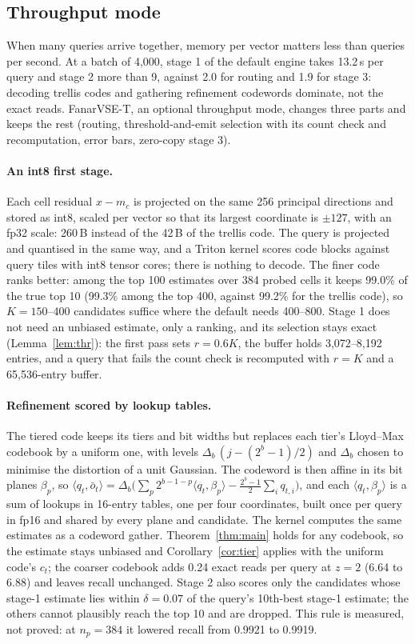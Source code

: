 \documentclass[fleqn,10pt]{wlscirep}
\begin{document}
\subsection{Throughput mode}\label{sec:tmode}
When many queries arrive together, memory per vector matters less than queries per second. At a batch of 4{,}000, stage 1 of the default engine takes 13.2\,\textmu s per query and stage 2 more than 9, against 2.0 for routing and 1.9 for stage 3: decoding trellis codes and gathering refinement codewords dominate, not the exact reads. FanarVSE-T, an optional throughput mode, changes three parts and keeps the rest (routing, threshold-and-emit selection with its count check and recomputation, error bars, zero-copy stage 3).

\paragraph{An int8 first stage.} Each cell residual $x-m_c$ is projected on the same 256 principal directions and stored as int8, scaled per vector so that its largest coordinate is $\pm127$, with an fp32 scale: 260\,B instead of the 42\,B of the trellis code. The query is projected and quantised in the same way, and a Triton kernel scores code blocks against query tiles with int8 tensor cores; there is nothing to decode. The finer code ranks better: among the top 100 estimates over 384 probed cells it keeps 99.0\% of the true top 10 (99.3\% among the top 400, against 99.2\% for the trellis code), so $K=150$--400 candidates suffice where the default needs 400--800. Stage 1 does not need an unbiased estimate, only a ranking, and its selection stays exact (Lemma~\ref{lem:thr}): the first pass sets $r=0.6K$, the buffer holds 3{,}072--8{,}192 entries, and a query that fails the count check is recomputed with $r=K$ and a 65{,}536-entry buffer.

\paragraph{Refinement scored by lookup tables.} The tiered code keeps its tiers and bit widths but replaces each tier's Lloyd--Max codebook by a uniform one, with levels $\Delta_b\,(j-(2^b-1)/2)$ and $\Delta_b$ chosen to minimise the distortion of a unit Gaussian. The codeword is then affine in its bit planes $\beta_p$, so $\langle q_t,\bar o_t\rangle=\Delta_b\big(\sum_p 2^{b-1-p}\langle q_t,\beta_p\rangle-\tfrac{2^b-1}{2}\sum_i q_{t,i}\big)$, and each $\langle q_t,\beta_p\rangle$ is a sum of lookups in 16-entry tables, one per four coordinates, built once per query in fp16 and shared by every plane and candidate. The kernel computes the same estimates as a codeword gather. Theorem~\ref{thm:main} holds for any codebook, so the estimate stays unbiased and Corollary~\ref{cor:tier} applies with the uniform code's $c_t$; the coarser codebook adds 0.24 exact reads per query at $z=2$ (6.64 to 6.88) and leaves recall unchanged. Stage 2 also scores only the candidates whose stage-1 estimate lies within $\delta=0.07$ of the query's 10th-best stage-1 estimate; the others cannot plausibly reach the top 10 and are dropped. This rule is measured, not proved: at $n_p=384$ it lowered recall from 0.9921 to 0.9919.
\end{document}
